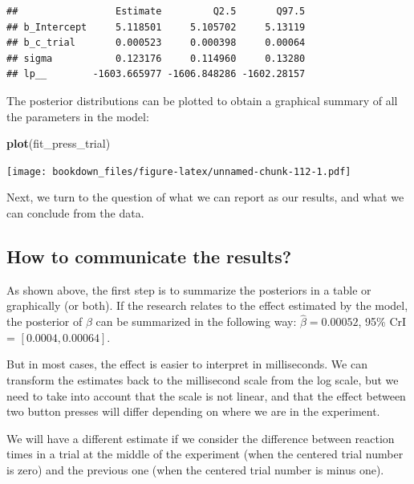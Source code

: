 \documentclass[12pt,]{krantz}
\newenvironment{Shaded}{\begin{snugshade}}{\end{snugshade}}
\newcommand{\KeywordTok}[1]{\textcolor[rgb]{0.13,0.29,0.53}{\textbf{#1}}}
\newcommand{\NormalTok}[1]{#1}
\theoremstyle{definition}
\theoremstyle{definition}
\theoremstyle{definition}
\theoremstyle{remark}
\begin{document}
\begin{verbatim}
##                 Estimate         Q2.5       Q97.5
## b_Intercept     5.118501     5.105702     5.13119
## b_c_trial       0.000523     0.000398     0.00064
## sigma           0.123176     0.114960     0.13280
## lp__        -1603.665977 -1606.848286 -1602.28157
\end{verbatim}

The posterior distributions can be plotted to obtain a graphical summary of all the parameters in the model:

\begin{Shaded}
\begin{Highlighting}[]
\KeywordTok{plot}\NormalTok{(fit_press_trial)}
\end{Highlighting}
\end{Shaded}

\texttt{[image: bookdown\_files/figure-latex/unnamed-chunk-112-1.pdf]}

Next, we turn to the question of what we can report as our results, and what we can conclude from the data.

\hypertarget{how-to-communicate-the-results-1}{%
\subsection{How to communicate the results?}\label{how-to-communicate-the-results-1}}

As shown above, the first step is to summarize the posteriors in a table or graphically (or both). If the research relates to the effect estimated by the model, the posterior of \(\beta\) can be summarized in the following way: \(\hat\beta = 0.00052\), 95\% CrI = \([ 0.0004 , 0.00064 ]\).

But in most cases, the effect is easier to interpret in milliseconds. We can transform the estimates back to the millisecond scale from the log scale, but we need to take into account that the scale is not linear, and that the effect between two button presses will differ depending on where we are in the experiment.

We will have a different estimate if we consider the difference between reaction times in a trial at the middle of the experiment (when the centered trial number is zero) and the previous one (when the centered trial number is minus one).
\end{document}
